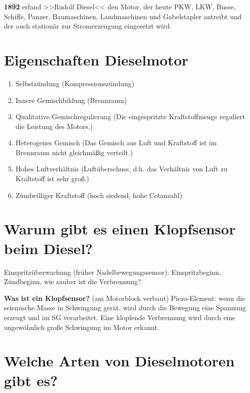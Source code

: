 \textbf{1892} erfand >>Rudolf Diesel<< den Motor, der heute PKW, LKW,
Busse, Schiffe, Panzer, Baumaschinen, Landmaschinen und Gabelstapler
antreibt und der auch stationär zur Stromerzeugung eingesetzt wird.

\section{Eigenschaften Dieselmotor}\label{eigenschaften-dieselmotor}

\begin{enumerate}
\item
  Selbstzündung (Kompressionszündung)
\item
  Innere Gemischbildung (Brennraum)
\item
  Qualitative Gemischregulierung (Die eingespritzte Kraftstoffmenge
  reguliert die Leistung des Motors.)
\item
  Heterogenes Gemisch (Das Gemisch aus Luft und Kraftstoff ist im
  Brennraum nicht gleichmäßig verteilt.)
\item
  Hohes Luftverhältnis (Luftüberschuss, d.h. das Verhältnis von Luft zu
  Kraftstoff ist sehr groß.)
\item
  Zündwilliger Kraftstoff (hoch siedend, hohe Cetanzahl)
\end{enumerate}

\section{Warum gibt es einen Klopfsensor beim
Diesel?}\label{warum-gibt-es-einen-klopfsensor-beim-diesel}

Einspritzüberwachung (früher Nadelbewegungssensor): Einspritzbeginn,
Zündbeginn, wie sauber ist die Verbrennung?

\textbf{Was ist ein Klopfsensor?} (am Motorblock verbaut) Piezo-Element:
wenn die seismische Masse in Schwingung gerät, wird durch die Bewegung
eine Spannung erzeugt und im SG verarbeitet. Eine klopfende Verbrennung
wird durch eine ungewöhnlich große Schwingung im Motor erkannt.

\section{Welche Arten von Dieselmotoren gibt
es?}\label{welche-arten-von-dieselmotoren-gibt-es}

